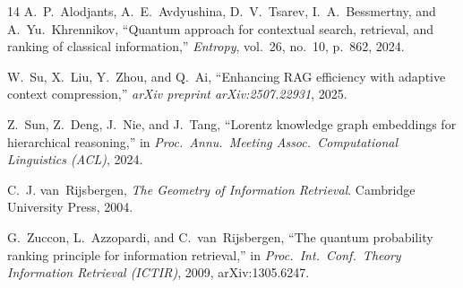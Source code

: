 \documentclass[journal]{IEEEtran}
\begin{document}
\begin{thebibliography}{14}
A.~P.~Alodjants, A.~E.~Avdyushina, D.~V.~Tsarev, I.~A.~Bessmertny,
and A.~Yu.~Khrennikov,
``Quantum approach for contextual search, retrieval, and ranking of
classical information,''
\emph{Entropy}, vol.~26, no.~10, p.~862, 2024.

W.~Su, X.~Liu, Y.~Zhou, and Q.~Ai,
``Enhancing {RAG} efficiency with adaptive context compression,''
\emph{arXiv preprint arXiv:2507.22931}, 2025.

Z.~Sun, Z.~Deng, J.~Nie, and J.~Tang,
``Lorentz knowledge graph embeddings for hierarchical reasoning,''
in \emph{Proc.\ Annu.\ Meeting Assoc.\ Computational Linguistics (ACL)},
2024.

C.~J. van~Rijsbergen,
\emph{The Geometry of Information Retrieval}.
Cambridge University Press, 2004.

G.~Zuccon, L.~Azzopardi, and C.~van~Rijsbergen,
``The quantum probability ranking principle for information retrieval,''
in \emph{Proc.\ Int.\ Conf.\ Theory Information Retrieval (ICTIR)}, 2009,
arXiv:1305.6247.

\end{thebibliography}
\end{document}
